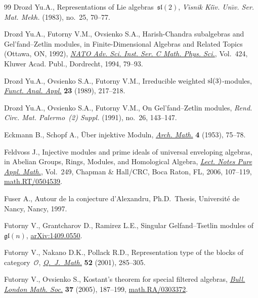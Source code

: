 \documentclass[pdftex]{sigma}
\begin{document}
\begin{thebibliography}{99}
Drozd Yu.A., Representations of {L}ie algebras~{${\mathfrak{sl}}(2)$},
  \textit{V\={\i}snik Ki\"{\i}v. Un\={\i}v. Ser. Mat. Mekh.}  (1983), no.~25,
  70--77.

Drozd Yu.A., Futorny V.M., Ovsienko S.A., Harish-{C}handra subalgebras and
  {G}el'fand--{Z}etlin modules, in Finite-Dimensional Algebras and Related
  Topics ({O}ttawa, {ON}, 1992), \href{http://dx.doi.org/10.1007/978-94-017-1556-0_5}{\textit{NATO Adv. Sci. Inst. Ser. C Math.
  Phys. Sci.}}, Vol.~424, Kluwer Acad. Publ., Dordrecht, 1994, 79--93.

Drozd Yu.A., Ovsienko S.A., Futorny V.M., Irreducible weighted {${\rm
  sl}(3)$}-modules, \href{http://dx.doi.org/10.1007/BF01079528}{\textit{Funct. Anal. Appl.}} \textbf{23} (1989), 217--218.

Drozd Yu.A., Ovsienko S.A., Futorny V.M., On {G}el'fand--{Z}etlin modules,
  \textit{Rend. Circ. Mat. Palermo~(2) Suppl.}  (1991), no.~26, 143--147.

Eckmann B., Schopf A., \"{U}ber injektive {M}oduln, \href{http://dx.doi.org/10.1007/BF01899665}{\textit{Arch. Math.}}
  \textbf{4} (1953), 75--78.

Feldvoss J., Injective modules and prime ideals of universal enveloping
  algebras, in Abelian Groups, Rings, Modules, and Homological Algebra,
  \href{http://dx.doi.org/10.1201/9781420010763.ch11}{\textit{Lect. Notes Pure Appl. Math.}}, Vol.~249, Chapman \& Hall/CRC, Boca
  Raton, FL, 2006, 107--119, \href{http://arxiv.org/abs/math.RT/0504539}{math.RT/0504539}.

Fuser A., Autour de la conjecture d'Alexandru, Ph.D.~Thesis, Universit\'e de
  Nancy, Nancy, 1997.

Futorny V., Grantcharov D., Ramirez L.E., Singular Gelfand--Tsetlin modules of
  $\mathfrak{gl}(n)$, \href{http://arxiv.org/abs/1409.0550}{arXiv:1409.0550}.

Futorny V., Nakano D.K., Pollack R.D., Representation type of the blocks of
  category~{${\mathcal O}$}, \href{http://dx.doi.org/10.1093/qjmath/52.3.285}{\textit{Q.~J.~Math.}} \textbf{52} (2001), 285--305.

Futorny V., Ovsienko S., Kostant's theorem for special f\/iltered algebras,
  \href{http://dx.doi.org/10.1112/S0024609304003844}{\textit{Bull. London Math. Soc.}} \textbf{37} (2005), 187--199,
  \href{http://arxiv.org/abs/math.RA/0303372}{math.RA/0303372}.


\end{thebibliography}
\end{document}
